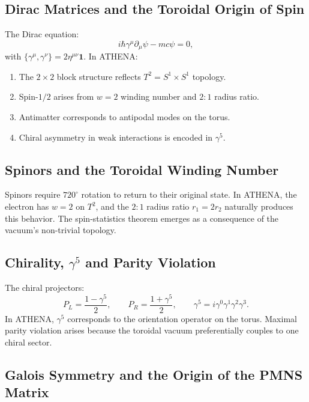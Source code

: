 \documentclass[12pt, a4paper]{article}
\begin{document}
\subsection{Dirac Matrices and the Toroidal Origin of Spin}
\label{sec:dirac_toroidal}
The Dirac equation:
\begin{equation}
i\hbar \gamma^\mu \partial_\mu \psi - mc \psi = 0,
\label{eq:dirac}
\end{equation}
with $\{\gamma^\mu, \gamma^\nu\} = 2\eta^{\mu\nu}\mathbf{1}$. In ATHENA:
\begin{enumerate}
    \item The $2\times 2$ block structure reflects $T^2 = S^1 \times S^1$ topology.
    \item Spin-$1/2$ arises from $w=2$ winding number and $2:1$ radius ratio.
    \item Antimatter corresponds to antipodal modes on the torus.
    \item Chiral asymmetry in weak interactions is encoded in $\gamma^5$.
\end{enumerate}

\subsection{Spinors and the Toroidal Winding Number}
\label{sec:spinor}
Spinors require $720^\circ$ rotation to return to their original state. In ATHENA, the electron has $w=2$ on $T^2$, and the $2:1$ radius ratio $r_1 = 2r_2$ naturally produces this behavior. The spin-statistics theorem emerges as a consequence of the vacuum's non-trivial topology.

\subsection{Chirality, $\gamma^5$ and Parity Violation}
\label{sec:gamma5}
The chiral projectors:
\begin{equation}
P_L = \frac{1 - \gamma^5}{2}, \qquad P_R = \frac{1 + \gamma^5}{2}, \qquad \gamma^5 = i\gamma^0\gamma^1\gamma^2\gamma^3.
\label{eq:chiral_projectors}
\end{equation}
In ATHENA, $\gamma^5$ corresponds to the orientation operator on the torus. Maximal parity violation arises because the toroidal vacuum preferentially couples to one chiral sector.

\subsection{Galois Symmetry and the Origin of the PMNS Matrix}
\label{sec:pmns_galois}
\end{document}
